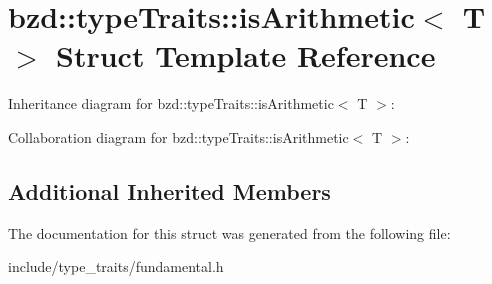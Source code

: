\hypertarget{structbzd_1_1typeTraits_1_1isArithmetic}{}\section{bzd\+:\+:type\+Traits\+:\+:is\+Arithmetic$<$ T $>$ Struct Template Reference}
\label{structbzd_1_1typeTraits_1_1isArithmetic}


Inheritance diagram for bzd\+:\+:type\+Traits\+:\+:is\+Arithmetic$<$ T $>$\+:


Collaboration diagram for bzd\+:\+:type\+Traits\+:\+:is\+Arithmetic$<$ T $>$\+:
\subsection*{Additional Inherited Members}


The documentation for this struct was generated from the following file\+:\begin{DoxyCompactItemize}
\item 
include/type\+\_\+traits/fundamental.\+h\end{DoxyCompactItemize}
